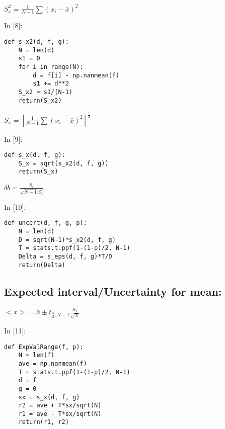 \documentclass[11pt]{article}
\newif\ifcode
\newif\ifleftmargins
\newlength{\promptlength}
\newcommand{\prompt}[3]{
        \needspace{1.1cm}
        \settowidth{\promptlength}{ #1 [#3] }
        \ifleftmargins\hspace{-\promptlength}\hspace{-5pt}\fi
        {\color{#2}#1 [#3]:}
        \ifleftmargins\vspace{-2.7ex}\fi
    }
\begin{document}
    \(S_x^2 = \frac{1}{N-1} \sum(x_i - \bar{x})^2\)

    
\prompt{In}{incolor}{8}
\codetrue
\begin{tcolorbox}[breakable, size=fbox, boxrule=1pt, pad at break*=1mm, colback=cellbackground, colframe=cellborder]
\begin{verbatim}
def s_x2(d, f, g):    
    N = len(d)
    s1 = 0
    for i in range(N):
        d = f[i] - np.nanmean(f)
        s1 += d**2
    S_x2 = s1/(N-1)
    return(S_x2)
\end{verbatim}
\end{tcolorbox}
\codefalse

    \(S_x = \left[ \frac{1}{N-1} \sum(x_i - \bar{x})^2 \right]^\frac{1}{2}\)

    
\prompt{In}{incolor}{9}
\codetrue
\begin{tcolorbox}[breakable, size=fbox, boxrule=1pt, pad at break*=1mm, colback=cellbackground, colframe=cellborder]
\begin{verbatim}
def s_x(d, f, g):  
    S_x = sqrt(s_x2(d, f, g))
    return(S_x)
\end{verbatim}
\end{tcolorbox}
\codefalse

    \(\delta b = \frac{S_\epsilon}{\sqrt{N-1} S_x^2}\)

    
\prompt{In}{incolor}{10}
\codetrue
\begin{tcolorbox}[breakable, size=fbox, boxrule=1pt, pad at break*=1mm, colback=cellbackground, colframe=cellborder]
\begin{verbatim}
def uncert(d, f, g, p):
    N = len(d)
    D = sqrt(N-1)*s_x2(d, f, g)
    T = stats.t.ppf(1-(1-p)/2, N-1)
    Delta = s_eps(d, f, g)*T/D
    return(Delta)
\end{verbatim}
\end{tcolorbox}
\codefalse

    \hypertarget{expected-intervaluncertainty-for-mean}{%
\subsection{Expected interval/Uncertainty for
mean:}\label{expected-intervaluncertainty-for-mean}}

\(<x> = \bar{x} \pm t_{\frac{\alpha}{2}, N-1} \frac{S_x}{\sqrt{N}}\)

    
\prompt{In}{incolor}{11}
\codetrue
\begin{tcolorbox}[breakable, size=fbox, boxrule=1pt, pad at break*=1mm, colback=cellbackground, colframe=cellborder]
\begin{verbatim}
def ExpValRange(f, p):
    N = len(f)
    ave = np.nanmean(f)
    T = stats.t.ppf(1-(1-p)/2, N-1)
    d = f
    g = 0
    sx = s_x(d, f, g)
    r2 = ave + T*sx/sqrt(N)
    r1 = ave - T*sx/sqrt(N)
    return(r1, r2)
\end{verbatim}
\end{tcolorbox}
\codefalse
\end{document}
